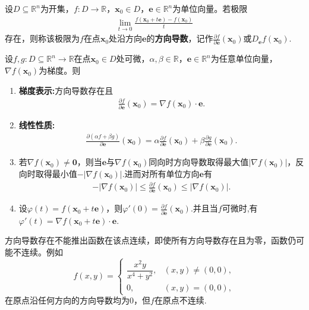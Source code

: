 \documentclass[../../main.tex]{subfiles}%
\begin{document}
\begin{definition}
设$D\subseteq\mathbb{R}^n$为开集，$f:D\to\mathbb{R}$，$\bm{x}_0\in D$，$\bm{e}\in\mathbb{R}^n$为单位向量。若极限
\begin{align*}
\lim_{t\to 0}\frac{f(\bm{x}_0+t\bm{e})-f(\bm{x}_0)}{t}
\end{align*}
存在，则称该极限为$f$在点$\bm{x}_0$处沿方向$\bm{e}$的\textbf{方向导数}，记作$\frac{\partial f}{\partial\bm{e}}(\bm{x}_0)$或$D_{\bm{e}}f(\bm{x}_0)$.
\end{definition}

\begin{theorem}[方向导数的基本性质]\label{theorem:方向导数的基本性质}
设$f,g:D\subseteq\mathbb{R}^n\to\mathbb{R}$在点$\bm{x}_0\in D$处可微，$\alpha,\beta\in\mathbb{R}$，$\bm{e}\in \mathbb{R}^n$为任意单位向量，$\nabla f(\bm{x}_0)$为梯度。则
\begin{enumerate}[(1)]
\item\label{theorem:方向导数的基本性质-1} \textbf{梯度表示:}方向导数存在且
\begin{align*}
\frac{\partial f}{\partial\bm{e}}(\bm{x}_0)=\nabla f(\bm{x}_0)\cdot\bm{e}.
\end{align*}

\item \textbf{线性性质:}
\begin{align*}
\frac{\partial(\alpha f+\beta g)}{\partial\bm{e}}(\bm{x}_0)=\alpha\frac{\partial f}{\partial\bm{e}}(\bm{x}_0)+\beta\frac{\partial g}{\partial\bm{e}}(\bm{x}_0).
\end{align*}

\item 若$\nabla f(\bm{x}_0)\neq\bm{0}$，则当$\bm{e}$与$\nabla f(\bm{x}_0)$同向时方向导数取得最大值$|\nabla f(\bm{x}_0)|$，反向时取得最小值$-|\nabla f(\bm{x}_0)|$.进而对所有单位方向$\bm{e}$有
\begin{align*}
-|\nabla f(\bm{x}_0)|\leqslant\frac{\partial f}{\partial\bm{e}}(\bm{x}_0)\leqslant|\nabla f(\bm{x}_0)|.
\end{align*}

\item 设$\varphi(t)=f(\bm{x}_0+t\bm{e})$，则$\varphi'(0)=\frac{\partial f}{\partial\bm{e}}(\bm{x}_0)$.并且当$f$可微时,有$\varphi'(t)=\nabla f(\bm{x}_0+t\bm{e})\cdot\bm{e}$.
\end{enumerate}
\end{theorem}
\begin{remark}
方向导数存在不能推出函数在该点连续，即使所有方向导数存在且为零，函数仍可能不连续。例如
\[
f(x,y)=\begin{cases}\dfrac{x^{2}y}{x^{4}+y^{2}},&(x,y)\neq(0,0),\\0,&(x,y)=(0,0),\end{cases}
\]
在原点沿任何方向的方向导数均为$0$，但$f$在原点不连续.
\end{remark}
\end{document}

